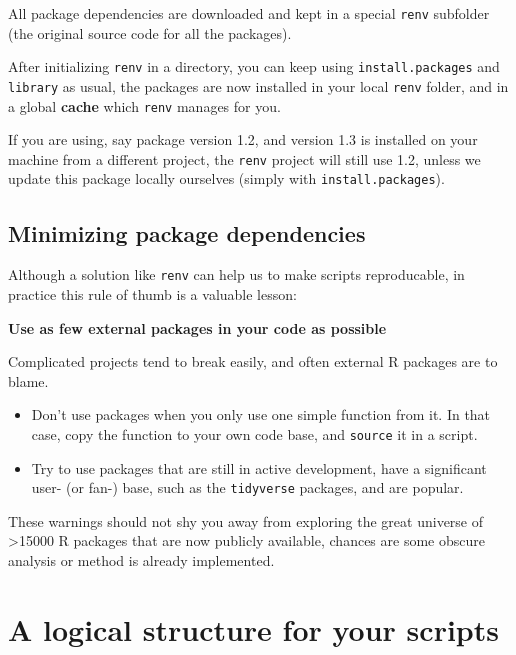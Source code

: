 \documentclass[]{book}
\begin{document}
All package dependencies are downloaded and kept in a special \texttt{renv} subfolder (the original source code for all the packages).

After initializing \texttt{renv} in a directory, you can keep using \texttt{install.packages} and \texttt{library} as usual, the packages are now installed in your local \texttt{renv} folder, and in a global \textbf{cache} which \texttt{renv} manages for you.

If you are using, say package version 1.2, and version 1.3 is installed on your machine from a different project, the \texttt{renv} project will still use 1.2, unless we update this package locally ourselves (simply with \texttt{install.packages}).

\hypertarget{minimizing-package-dependencies}{%
\subsection{Minimizing package dependencies}\label{minimizing-package-dependencies}}

Although a solution like \texttt{renv} can help us to make scripts reproducable, in practice this rule of thumb is a valuable lesson:

\textbf{Use as few external packages in your code as possible}

Complicated projects tend to break easily, and often external R packages are to blame.

\begin{itemize}
\item
  Don't use packages when you only use one simple function from it. In that case, copy the function to your own code base, and \texttt{source} it in a script.
\item
  Try to use packages that are still in active development, have a significant user- (or fan-) base, such as the \texttt{tidyverse} packages, and are popular.
\end{itemize}

These warnings should not shy you away from exploring the great universe of \textgreater15000 R packages that are now publicly available, chances are some obscure analysis or method is already implemented.

\hypertarget{a-logical-structure-for-your-scripts}{%
\section{A logical structure for your scripts}\label{a-logical-structure-for-your-scripts}}
\end{document}
